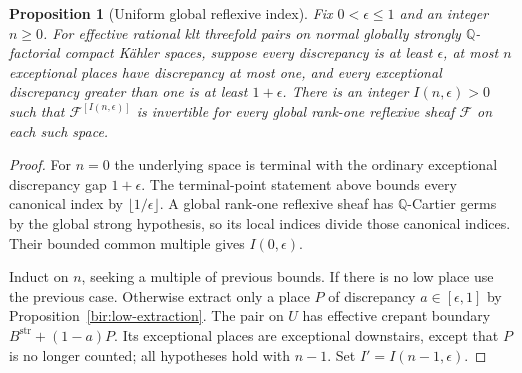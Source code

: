 \documentclass[11pt,letterpaper]{article}
\newcommand{\Q}{\mathbb{Q}}
\newtheorem{proposition}[theorem]{Proposition}
\theoremstyle{definition}
\theoremstyle{remark}
\begin{document}
\begin{proposition}[Uniform global reflexive index]
\label{bir:index}
Fix $0<\epsilon\leq1$ and an integer $n\geq0$.  For effective
rational klt threefold pairs on normal globally strongly
$\Q$-factorial compact K\"ahler spaces, suppose every discrepancy is
at least $\epsilon$, at most $n$ exceptional places have discrepancy
at most one, and every exceptional discrepancy greater than one is
at least $1+\epsilon$.  There is an integer $I(n,\epsilon)>0$ such
that $\mathcal F^{[I(n,\epsilon)]}$ is invertible for every global
rank-one reflexive sheaf $\mathcal F$ on each such space.
\end{proposition}

\begin{proof}
For $n=0$ the underlying space is terminal with the ordinary
exceptional discrepancy gap $1+\epsilon$.  The terminal-point
statement above bounds every canonical index by
$\lfloor1/\epsilon\rfloor$.  A global rank-one reflexive sheaf has
$\Q$-Cartier germs by the global strong hypothesis, so its local
indices divide those canonical indices.  Their bounded common
multiple gives $I(0,\epsilon)$.

Induct on $n$, seeking a multiple of previous bounds.  If there is no
low place use the previous case.  Otherwise extract only a place
$P$ of discrepancy $a\in[\epsilon,1]$ by
Proposition~\ref{bir:low-extraction}.  The pair on $U$ has effective
crepant boundary $B^{\mathrm{str}}+(1-a)P$.  Its exceptional places
are exceptional downstairs, except that $P$ is no longer counted;
all hypotheses hold with $n-1$.  Set $I'=I(n-1,\epsilon)$.


\end{proof}
\end{document}
